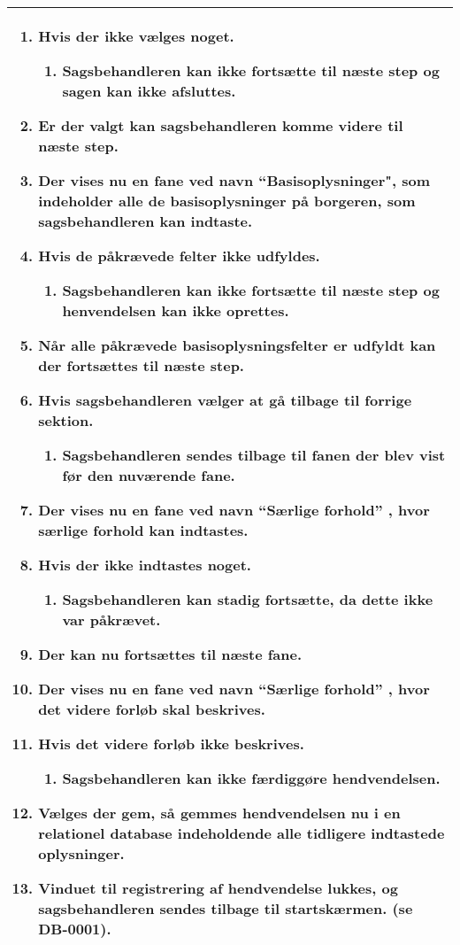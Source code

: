 \documentclass[../../main.tex]{subfiles}
\begin{document}
\begin{center}
\begin{longtable}{| p{}|}
\begin{adjustwidth}{1cm}{}
\begin{enumerate}
    \item Hvis der ikke vælges noget.
    \begin{enumerate}[label=\Alph*]
    \item Sagsbehandleren kan ikke fortsætte til næste step og sagen kan ikke afsluttes.
    \end{enumerate}
    \item Er der valgt kan sagsbehandleren komme videre til næste step.
    \item Der vises nu en fane ved navn “Basisoplysninger", som indeholder alle de basisoplysninger på borgeren, som sagsbehandleren kan indtaste.
    \item Hvis de påkrævede felter ikke udfyldes.
    \begin{enumerate}[label=\Alph*]
    \item Sagsbehandleren kan ikke fortsætte til næste step og henvendelsen kan ikke oprettes.
    \end{enumerate}
    \item Når alle påkrævede basisoplysningsfelter er udfyldt kan der fortsættes til næste step.
    \item Hvis sagsbehandleren vælger at gå tilbage til forrige sektion.
    \begin{enumerate}[label=\Alph*]
    \item Sagsbehandleren sendes tilbage til fanen der blev vist før den nuværende fane. 
    \end{enumerate}
    \item Der vises nu en fane ved navn “Særlige forhold” , hvor særlige forhold kan indtastes.
    \item Hvis der ikke indtastes noget.
    \begin{enumerate}[label=\Alph*]
    \item Sagsbehandleren kan stadig fortsætte, da dette ikke var påkrævet.
    \end{enumerate}
    \item Der kan nu fortsættes til næste fane.
    \item Der vises nu en fane ved navn “Særlige forhold” , hvor det videre forløb skal beskrives.
    \item Hvis det videre forløb ikke beskrives.
    \begin{enumerate}[label=\Alph*]
    \item Sagsbehandleren kan ikke færdiggøre hendvendelsen.
    \end{enumerate}
    \item Vælges der gem, så gemmes hendvendelsen nu i en relationel database indeholdende alle tidligere indtastede oplysninger.
    \item Vinduet til registrering af hendvendelse lukkes, og sagsbehandleren sendes tilbage til startskærmen. (se DB-0001). 
    \end{enumerate}
  \end{adjustwidth} \\ \hline


\end{longtable}
\end{center}
\end{document}
